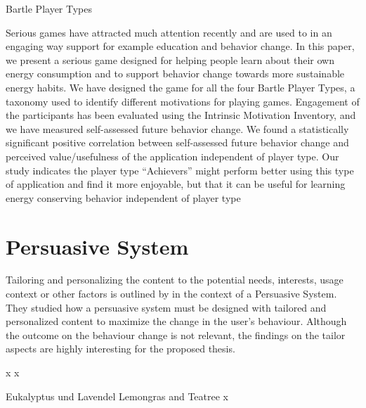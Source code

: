 Bartle Player Types

Serious games have attracted much attention recently and are used to in an engaging way support for example education and behavior change. In this paper, we present a serious game designed for helping people learn about their own energy consumption and to support behavior change towards more sustainable energy habits. We have designed the game for all the four Bartle Player Types, a taxonomy used to identify different motivations for playing games. Engagement of the participants has been evaluated using the Intrinsic Motivation Inventory, and we have measured self-assessed future behavior change. We found a statistically significant positive correlation between self-assessed future behavior change and perceived value/usefulness of the application independent of player type. Our study indicates the player type “Achievers” might perform better using this type of application and find it more enjoyable, but that it can be useful for learning energy conserving behavior independent of player type


\section{Persuasive System}
Tailoring and personalizing the content to the potential needs, interests, usage context or other factors is outlined by \cite{oinas2009persuasive} in the context of a Persuasive System. They studied how a persuasive system must be designed with tailored and personalized content to maximize the change in the user's behaviour. Although the outcome on the behaviour change is not relevant, the findings on the tailor aspects are highly interesting for the proposed thesis.

\newpage
x
\newpage
x





Eukalyptus und Lavendel
\newpage
Lemongras and Teatree
\newpage
x
\newpage

